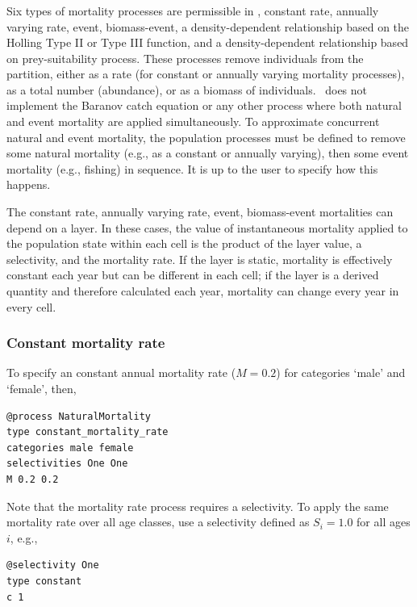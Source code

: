 \subsubsection{\label{sec:mortality}}

Six types of mortality processes are permissible in \SPM, constant rate, annually varying rate, event, biomass-event, a density-dependent relationship based on the Holling \citep{Holling1959} Type II or Type III function, and a density-dependent relationship based on prey-suitability process. These processes remove individuals from the partition, either as a rate (for constant or annually varying mortality processes), as a total number (abundance), or as a biomass of individuals. \SPM\ does not implement the Baranov catch equation or any other process where both natural and event mortality are applied simultaneously. To approximate concurrent natural and event mortality, the population processes must be defined to remove some natural mortality (e.g., as a constant or annually varying), then some event mortality (e.g., fishing) in sequence. It is up to the user to specify how this happens.

The constant rate, annually varying rate, event, biomass-event mortalities can depend on a layer. In these cases, the value of instantaneous mortality applied to the population state within each cell is the product of the layer value, a selectivity, and the mortality rate. If the layer is static, mortality is effectively constant each year but can be different in each cell; if the layer is a derived quantity and therefore calculated each year, mortality can change every year in every cell.

\subsubsection*{Constant mortality rate}

To specify an constant annual mortality rate ($M=0.2$) for categories `male' and `female', then, 
{\small{\begin{verbatim}
@process NaturalMortality
type constant_mortality_rate
categories male female
selectivities One One
M 0.2 0.2
\end{verbatim}}}

Note that the mortality rate process requires a selectivity. To apply the same mortality rate over all age classes, use a selectivity defined as $S_i=1.0$ for all ages $i$, e.g.,
{\small{\begin{verbatim}
@selectivity One
type constant
c 1
\end{verbatim}}}

